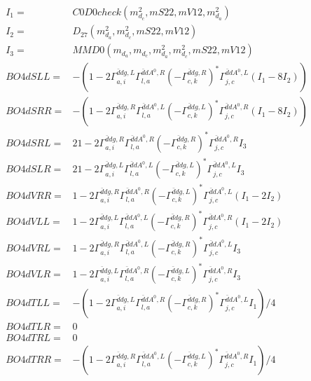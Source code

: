 \documentclass[A4,landscape]{article}
\begin{document}
\begin{align} 
I_1 = & C0D0check(m^2_{d_{{c}}}, mS22, mV12, m^2_{d_{{a}}}) \\ 
I_2 = & D_{27}(m^2_{d_{{a}}}, m^2_{d_{{c}}}, mS22, mV12) \\ 
I_3 = & MMD0(m_{d_{{a}}}, m_{d_{{c}}}, m^2_{d_{{a}}}, m^2_{d_{{c}}}, mS22, mV12) \\ 
  BO4dSLL= & -(1
-
2 \Gamma^{\bar{d}d g ,L}_{a, i} \Gamma^{\bar{d}d A^0 ,R}_{l, a} (- \Gamma^{\bar{d}d g ,R} _{c, k})^* \Gamma^{\bar{d}d A^0 ,L}_{j, c} (I_1 - 8 I_2)) \\ 
  BO4dSRR= & -(1
-
2 \Gamma^{\bar{d}d g ,R}_{a, i} \Gamma^{\bar{d}d A^0 ,L}_{l, a} (- \Gamma^{\bar{d}d g ,L} _{c, k})^* \Gamma^{\bar{d}d A^0 ,R}_{j, c} (I_1 - 8 I_2)) \\ 
  BO4dSRL= & 2 1
-
2 \Gamma^{\bar{d}d g ,R}_{a, i} \Gamma^{\bar{d}d A^0 ,R}_{l, a} (- \Gamma^{\bar{d}d g ,R} _{c, k})^* \Gamma^{\bar{d}d A^0 ,R}_{j, c} I_3 \\ 
  BO4dSLR= & 2 1
-
2 \Gamma^{\bar{d}d g ,L}_{a, i} \Gamma^{\bar{d}d A^0 ,L}_{l, a} (- \Gamma^{\bar{d}d g ,L} _{c, k})^* \Gamma^{\bar{d}d A^0 ,L}_{j, c} I_3 \\ 
  BO4dVRR= & 1
-
2 \Gamma^{\bar{d}d g ,R}_{a, i} \Gamma^{\bar{d}d A^0 ,R}_{l, a} (- \Gamma^{\bar{d}d g ,L} _{c, k})^* \Gamma^{\bar{d}d A^0 ,L}_{j, c} (I_1 - 2 I_2) \\ 
  BO4dVLL= & 1
-
2 \Gamma^{\bar{d}d g ,L}_{a, i} \Gamma^{\bar{d}d A^0 ,L}_{l, a} (- \Gamma^{\bar{d}d g ,R} _{c, k})^* \Gamma^{\bar{d}d A^0 ,R}_{j, c} (I_1 - 2 I_2) \\ 
  BO4dVRL= & 1
-
2 \Gamma^{\bar{d}d g ,R}_{a, i} \Gamma^{\bar{d}d A^0 ,L}_{l, a} (- \Gamma^{\bar{d}d g ,R} _{c, k})^* \Gamma^{\bar{d}d A^0 ,L}_{j, c} I_3 \\ 
  BO4dVLR= & 1
-
2 \Gamma^{\bar{d}d g ,L}_{a, i} \Gamma^{\bar{d}d A^0 ,R}_{l, a} (- \Gamma^{\bar{d}d g ,L} _{c, k})^* \Gamma^{\bar{d}d A^0 ,R}_{j, c} I_3 \\ 
  BO4dTLL= & -(1
-
2 \Gamma^{\bar{d}d g ,L}_{a, i} \Gamma^{\bar{d}d A^0 ,R}_{l, a} (- \Gamma^{\bar{d}d g ,R} _{c, k})^* \Gamma^{\bar{d}d A^0 ,L}_{j, c} I_1)/4 \\ 
  BO4dTLR= & 0 \\ 
  BO4dTRL= & 0 \\ 
  BO4dTRR= & -(1
-
2 \Gamma^{\bar{d}d g ,R}_{a, i} \Gamma^{\bar{d}d A^0 ,L}_{l, a} (- \Gamma^{\bar{d}d g ,L} _{c, k})^* \Gamma^{\bar{d}d A^0 ,R}_{j, c} I_1)/4 \\ 
\end{align} 
\end{document}
